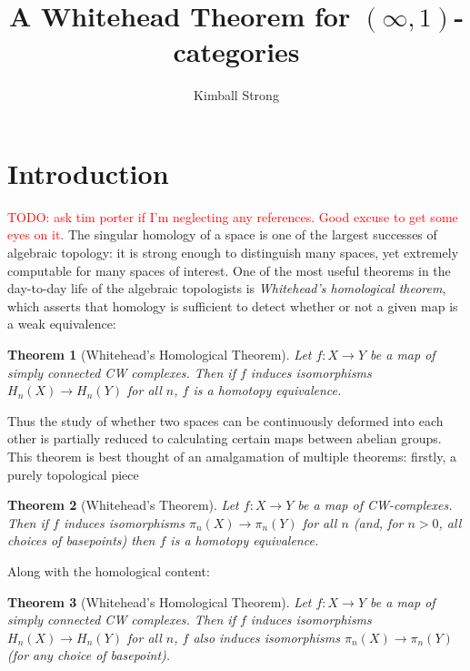 \documentclass[12pt]{article}
\newtheorem{theorem}{Theorem}[section]
\theoremstyle{definition}
\newcommand{\TODO}[1]{\textcolor{red}{TODO: {#1}}}
\begin{document}
\author{Kimball Strong}
\date{}

\title{\vspace{-1in} A Whitehead Theorem for $(\infty,1)$-categories\\ \vspace{.1in}}

\maketitle
\section{Introduction}	
	\TODO{ask tim porter if I'm neglecting any references. Good excuse to get some eyes on it.}
	The singular homology of a space is one of the largest successes of algebraic topology: it is strong enough to distinguish many spaces, yet extremely computable for many spaces of interest. One of the most useful theorems in the day-to-day life of the algebraic topologists is \textit{Whitehead's homological theorem}, which asserts that homology is sufficient to detect whether or not a given map is a weak equivalence:
	\begin{theorem}[Whitehead's Homological Theorem]
		Let $f:X \to Y$ be a map of simply connected CW complexes. Then if $f$ induces isomorphisms $H_n(X) \to H_n(Y)$ for all $n$, $f$ is a homotopy equivalence. 
	\end{theorem}
	Thus the study of whether two spaces can be continuously deformed into each other is partially reduced to calculating certain maps between abelian groups. This theorem is best thought of an amalgamation of multiple theorems: firstly, a purely topological piece
	\begin{theorem}[Whitehead's Theorem]
		Let $f: X \to Y$ be a map of CW-complexes. Then if $f$ induces isomorphisms $\pi_n(X) \to \pi_n(Y)$ for all $n$ (and, for $n > 0$, all choices of basepoints) then $f$ is a homotopy equivalence.
	\end{theorem}
	Along with the homological content:
	\begin{theorem}[Whitehead's Homological Theorem]
		Let $f: X \to Y$ be a map of simply connected CW complexes. Then if $f$ induces isomorphisms $H_n(X) \to H_n(Y)$ for all $n$, $f$ also induces isomorphisms $\pi_n(X) \to \pi_n(Y)$ (for any choice of basepoint).
	\end{theorem}
\end{document}
